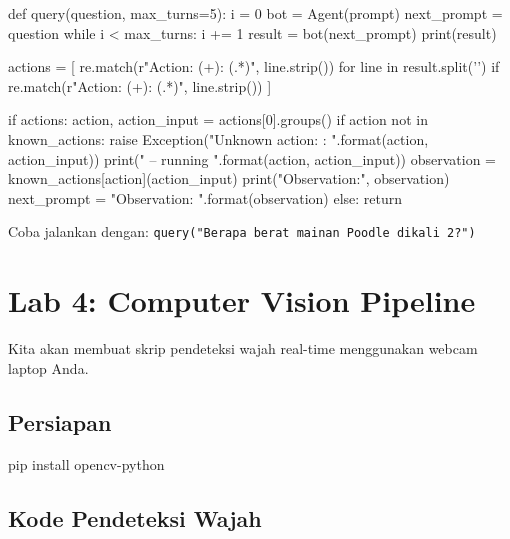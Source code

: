 \begin{codeblock}[language=Python]
def query(question, max_turns=5):
    i = 0
    bot = Agent(prompt)
    next_prompt = question
    while i < max_turns:
        i += 1
        result = bot(next_prompt)
        print(result)

        actions = [
            re.match(r"Action: (\w+): (.*)", line.strip())
            for line in result.split('\n')
            if re.match(r"Action: (\w+): (.*)", line.strip())
        ]

        if actions:
            action, action_input = actions[0].groups()
            if action not in known_actions:
                raise Exception("Unknown action: {}: {}".format(action, action_input))
            print(" -- running {} {}".format(action, action_input))
            observation = known_actions[action](action_input)
            print("Observation:", observation)
            next_prompt = "Observation: {}".format(observation)
        else:
            return
\end{codeblock}

Coba jalankan dengan:
\texttt{query("Berapa berat mainan Poodle dikali 2?")}

\chapter{Lab 4: Computer Vision Pipeline}
\label{chap:lab4}

Kita akan membuat skrip pendeteksi wajah real-time menggunakan webcam laptop Anda.

\section{Persiapan}
\begin{codeblock}
pip install opencv-python
\end{codeblock}

\section{Kode Pendeteksi Wajah}

